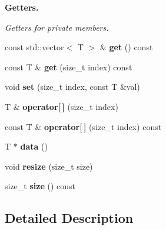 \begin{Indent}\textbf{ Getters.}\par
{\em Getters for private members. }\begin{DoxyCompactItemize}
\item 
\mbox{\label{classblaze_1_1util_1_1UnmanagedVector_a3676adcb36f6c460b77d58d066d86920}} 
const std\+::vector$<$ T $>$ \& {\bfseries get} () const
\item 
\mbox{\label{classblaze_1_1util_1_1UnmanagedVector_aeb328d698db37ac813e6977914d38208}} 
const T \& {\bfseries get} (size\+\_\+t index) const
\item 
\mbox{\label{classblaze_1_1util_1_1UnmanagedVector_a786430b2b037993cd3996a5c73f2a2cb}} 
void {\bfseries set} (size\+\_\+t index, const T \&val)
\item 
\mbox{\label{classblaze_1_1util_1_1UnmanagedVector_a12fee5564f693695745f8c98c852c13b}} 
T \& {\bfseries operator\mbox{[}$\,$\mbox{]}} (size\+\_\+t index)
\item 
\mbox{\label{classblaze_1_1util_1_1UnmanagedVector_a0309e57150e45c3fd801aae55d423a5c}} 
const T \& {\bfseries operator\mbox{[}$\,$\mbox{]}} (size\+\_\+t index) const
\item 
\mbox{\label{classblaze_1_1util_1_1UnmanagedVector_aab508ac9a2288fa20915e2f3025a1afd}} 
T $\ast$ {\bfseries data} ()
\item 
\mbox{\label{classblaze_1_1util_1_1UnmanagedVector_a3565245fa593d9928acac754d353ca33}} 
void {\bfseries resize} (size\+\_\+t size)
\item 
\mbox{\label{classblaze_1_1util_1_1UnmanagedVector_a7df456122f8074b1029f713b33586954}} 
size\+\_\+t {\bfseries size} () const
\end{DoxyCompactItemize}
\end{Indent}


\subsection{Detailed Description}
